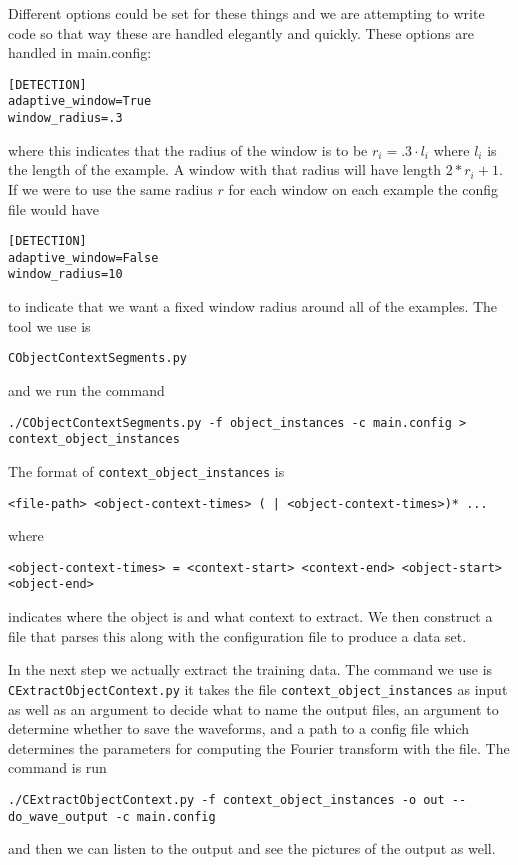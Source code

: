 \documentclass{article}
\begin{document}
Different options could be set for these things and we are
attempting to write code so that way these are handled elegantly
and quickly.  These options are handled in main.config:
\begin{verbatim}
[DETECTION]
adaptive_window=True
window_radius=.3
\end{verbatim}
where this indicates that the radius of the window is to be $r_i=.3\cdot l_i$
where $l_i$ is the length of the example.  A window with that radius will have
length $2*r_i+1$.
If we were to use the same radius $r$ for each window on each example the config
file would have
\begin{verbatim}
[DETECTION]
adaptive_window=False
window_radius=10
\end{verbatim}
to indicate that we want a fixed window radius around all of the
examples.  The tool we use is \begin{verbatim}
CObjectContextSegments.py\end{verbatim}
and we run the command 
\begin{verbatim}
./CObjectContextSegments.py -f object_instances -c main.config > context_object_instances
\end{verbatim}

The format of \texttt{context\_object\_instances} is
\begin{verbatim}
<file-path> <object-context-times> ( | <object-context-times>)* ...
\end{verbatim}
where
\begin{verbatim}
<object-context-times> = <context-start> <context-end> <object-start> <object-end>
\end{verbatim}
indicates where the object is and what context to extract. We then
construct a file that parses this along with the configuration
file to produce a data set.

In the next step we actually extract the training data. The command
we use is \texttt{CExtractObjectContext.py} it takes the file
\texttt{context\_object\_instances} as input as well as
an argument to decide what to name the output files, an argument
to determine whether to save the waveforms, and a path to a config
file which determines the parameters for computing the Fourier
transform with the file.  The command is run
\begin{verbatim}
./CExtractObjectContext.py -f context_object_instances -o out --do_wave_output -c main.config
\end{verbatim}
and then we can listen to the output and see the pictures of
the output as well.
\begin{verbatim}

\end{verbatim}
\end{document}
